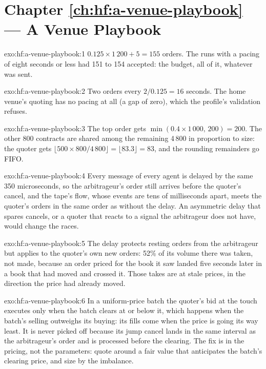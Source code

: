 \section*{Chapter \ref{ch:hf:a-venue-playbook} --- A Venue Playbook}

\begin{solution}{exo:hf:a-venue-playbook:1}
$0.125\times1\,200+5=155$ orders. The runs with a pacing of eight seconds or less had 151 to 154 accepted: the budget, all of it, whatever was sent.
\end{solution}

\begin{solution}{exo:hf:a-venue-playbook:2}
Two orders every $2/0.125=16$ seconds. The home venue's quoting has no pacing at all (a gap of zero), which the profile's validation refuses.
\end{solution}

\begin{solution}{exo:hf:a-venue-playbook:3}
The top order gets $\min(0.4\times1\,000,\,200)=200$. The other 800 contracts are shared among the remaining 4\,800 in proportion to size: the
quoter gets $\lfloor 500\times800/4\,800\rfloor=\lfloor83.3\rfloor=83$, and the rounding remainders go FIFO.
\end{solution}

\begin{solution}{exo:hf:a-venue-playbook:4}
Every message of every agent is delayed by the same 350 microseconds, so the arbitrageur's order still arrives before the quoter's cancel, and the
tape's flow, whose events are tens of milliseconds apart, meets the quoter's orders in the same order as without the delay. An asymmetric delay
that spares cancels, or a quoter that reacts to a signal the arbitrageur does not have, would change the races.
\end{solution}

\begin{solution}{exo:hf:a-venue-playbook:5}
The delay protects resting orders from the arbitrageur but applies to the quoter's own new orders: 52\% of its volume there was taken, not made,
because an order priced for the book it saw landed five seconds later in a book that had moved and crossed it. Those takes are at stale prices, in
the direction the price had already moved.
\end{solution}

\begin{solution}{exo:hf:a-venue-playbook:6}
In a uniform-price batch the quoter's bid at the touch executes only when the batch clears at or below it, which happens when the batch's selling
outweighs its buying: its fills come when the price is going its way least. It is never picked off because its jump cancel lands in the same interval
as the arbitrageur's order and is processed before the clearing. The fix is in the pricing, not the parameters: quote around a fair value that
anticipates the batch's clearing price, and size by the imbalance.
\end{solution}


